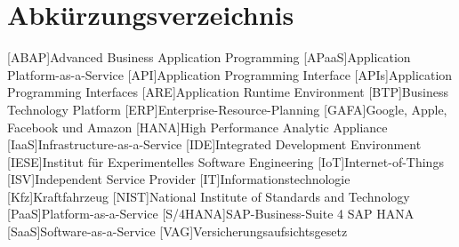 \clearpage
\chapter*{Abkürzungsverzeichnis}	

\begin{acronym}[XXXXXXX]
	[ABAP]{Advanced Business Application Programming}
	[APaaS]{Application Platform-as-a-Service}
	[API]{Application Programming Interface}
	[APIs]{Application Programming Interfaces}	
	[ARE]{Application Runtime Environment}
	[BTP]{Business Technology Platform}
	[ERP]{Enterprise-Resource-Planning}
	[GAFA]{Google, Apple, Facebook und Amazon}
	[HANA]{High Performance Analytic Appliance}
	[IaaS]{Infrastructure-as-a-Service}
	[IDE]{Integrated Development Environment}
	[IESE]{Institut für Experimentelles Software Engineering}
	[IoT]{Internet-of-Things}
	[ISV]{Independent Service Provider}
	[IT]{Informationstechnologie}
	[Kfz]{Kraftfahrzeug}
	[NIST]{National Institute of Standards and Technology}
	[PaaS]{Platform-as-a-Service}
	[S/4HANA]{SAP-Business-Suite 4 SAP HANA}
	[SaaS]{Software-as-a-Service}
	[VAG]{Versicherungsaufsichtsgesetz}
\end{acronym}
